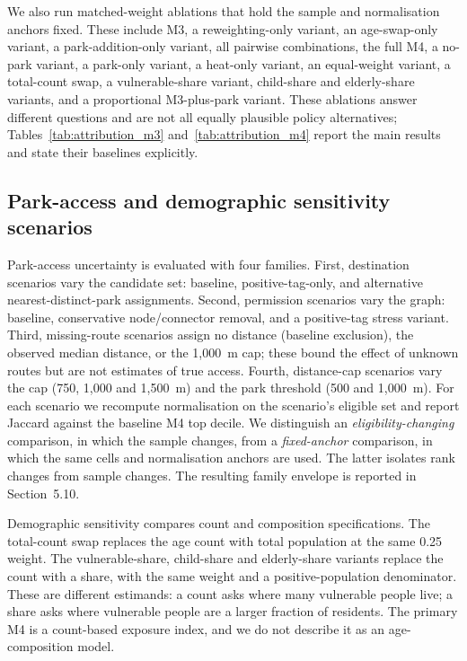 \documentclass[times,twoside]{_Templates/MultiTargetManuscript}
\begin{document}
We also run matched-weight ablations that hold the sample and normalisation
anchors fixed. These include M3, a reweighting-only variant, an age-swap-only
variant, a park-addition-only variant, all pairwise combinations, the full M4,
a no-park variant, a park-only variant, a heat-only variant, an equal-weight
variant, a total-count swap, a vulnerable-share variant, child-share and
elderly-share variants, and a proportional M3-plus-park variant. These
ablations answer different questions and are not all equally plausible policy
alternatives; Tables~\ref{tab:attribution_m3} and~\ref{tab:attribution_m4}
report the main results and state their baselines explicitly.

\subsection{Park-access and demographic sensitivity scenarios}

Park-access uncertainty is evaluated with four families. First, destination
scenarios vary the candidate set: baseline, positive-tag-only, and alternative
nearest-distinct-park assignments. Second, permission scenarios vary the graph:
baseline, conservative node/connector removal, and a positive-tag stress
variant. Third, missing-route scenarios assign no distance (baseline exclusion),
the observed median distance, or the 1,000~m cap; these bound the effect of
unknown routes but are not estimates of true access. Fourth, distance-cap
scenarios vary the cap (750, 1,000 and 1,500~m) and the park threshold (500 and
1,000~m). For each scenario we recompute normalisation on the scenario's
eligible set and report Jaccard against the baseline M4 top decile. We
distinguish an \emph{eligibility-changing} comparison, in which the sample
changes, from a \emph{fixed-anchor} comparison, in which the same cells and
normalisation anchors are used. The latter isolates rank changes from sample
changes. The resulting family envelope is reported in Section~5.10.

Demographic sensitivity compares count and composition specifications. The
total-count swap replaces the age count with total population at the same 0.25
weight. The vulnerable-share, child-share and elderly-share variants replace the
count with a share, with the same weight and a positive-population denominator.
These are different estimands: a count asks where many vulnerable people live; a
share asks where vulnerable people are a larger fraction of residents. The
primary M4 is a count-based exposure index, and we do not describe it as an
age-composition model.
\end{document}
